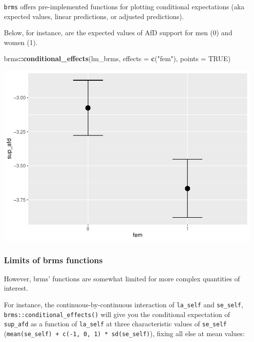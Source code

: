 \documentclass[
  11pt,
]{article}
\newenvironment{Shaded}{\begin{snugshade}}{\end{snugshade}}
\newcommand{\AttributeTok}[1]{\textcolor[rgb]{0.13,0.29,0.53}{#1}}
\newcommand{\ConstantTok}[1]{\textcolor[rgb]{0.56,0.35,0.01}{#1}}
\newcommand{\FunctionTok}[1]{\textcolor[rgb]{0.13,0.29,0.53}{\textbf{#1}}}
\newcommand{\NormalTok}[1]{#1}
\newcommand{\SpecialCharTok}[1]{\textcolor[rgb]{0.81,0.36,0.00}{\textbf{#1}}}
\newcommand{\StringTok}[1]{\textcolor[rgb]{0.31,0.60,0.02}{#1}}
\begin{document}
\texttt{brms} offers pre-implemented functions for plotting conditional expectations (aka expected values, linear predictions, or adjusted predictions).

Below, for instance, are the expected values of AfD support for men (0) and women (1).

\begin{Shaded}
\begin{Highlighting}[]
\NormalTok{brms}\SpecialCharTok{::}\FunctionTok{conditional\_effects}\NormalTok{(lm\_brms,}
                          \AttributeTok{effects =} \FunctionTok{c}\NormalTok{(}\StringTok{"fem"}\NormalTok{),}
                          \AttributeTok{points =} \ConstantTok{TRUE}\NormalTok{)}
\end{Highlighting}
\end{Shaded}

\includegraphics{02-02-lec_files/figure-latex/brms-marginal-effects-1.pdf}

\hypertarget{limits-of-brms-functions}{%
\subsubsection{Limits of brms functions}\label{limits-of-brms-functions}}

However, brms' functions are somewhat limited for more complex quantities of interest.

For instance, the continuous-by-continuous interaction
of \texttt{la\_self} and \texttt{se\_self}, \texttt{brms::conditional\_effects()} will give you the conditional expectation of \texttt{sup\_afd} as a function of \texttt{la\_self} at three characteristic values of \texttt{se\_self} (\texttt{mean(se\_self)\ +\ c(-1,\ 0,\ 1)\ *\ sd(se\_self)}), fixing all else at mean values:
\end{document}
